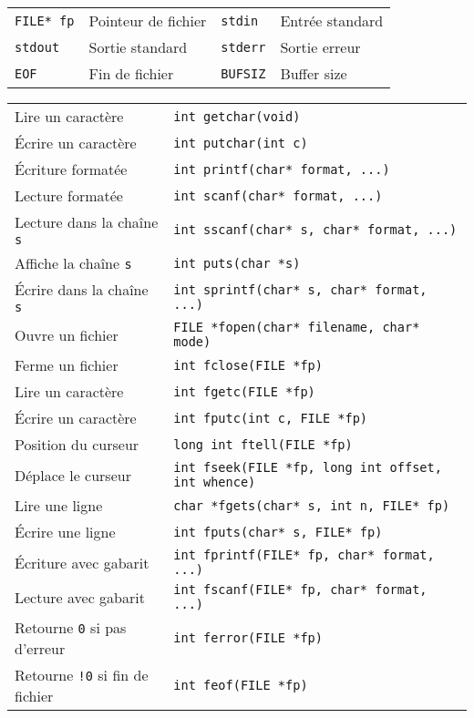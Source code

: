 \documentclass{article}
\newcommand{\cd}{\lstinline}
\begin{document}
\begin{multicols*}{3}
\begin{tabularx}{\linewidth}{
  >{\hsize=0.5\hsize}X%
  >{\hsize=1.5\hsize}X%
  >{\hsize=0.5\hsize}X%
  >{\hsize=1.5\hsize}X%
  }
  \cd{FILE* fp} & Pointeur de fichier & \cd{stdin} & Entrée standard \\
  \cd{stdout}   & Sortie standard     & \cd{stderr} & Sortie erreur \\
  \cd{EOF}      & Fin de fichier      & \cd{BUFSIZ} & Buffer size \\
\end{tabularx}

\begin{tabularx}{\linewidth}{Xl}
  Lire un caractère & \cd{int getchar(void)} \rule{0pt}{3ex} \\
  Écrire un caractère & \cd{int putchar(int c)} \\
  Écriture formatée & \cd{int printf(char* format, ...)} \\
  Lecture formatée & \cd{int scanf(char* format, ...)} \\
  Lecture dans la chaîne \texttt{s} & \cd{int sscanf(char* s, char* format, ...)} \\
  Affiche la chaîne \texttt{s} & \cd{int puts(char *s)} \\
  Écrire dans la chaîne \texttt{s} & \cd{int sprintf(char* s, char* format, ...)}  \\
  Ouvre un fichier & \cd{FILE *fopen(char* filename, char* mode)} \\
  Ferme un fichier & \cd{int fclose(FILE *fp)} \\
  Lire un caractère & \cd{int fgetc(FILE *fp)} \\
  Écrire un caractère & \cd{int fputc(int c, FILE *fp)} \\

  Position du curseur & \cd{long int ftell(FILE *fp)} \\
  Déplace le curseur & \cd{int fseek(FILE *fp, long int offset, int whence)} \\

  Lire une ligne & \cd{char *fgets(char* s, int n, FILE* fp)} \\
  Écrire une ligne & \cd{int fputs(char* s, FILE* fp)} \\

  Écriture avec gabarit & \cd{int fprintf(FILE* fp, char* format, ...)} \\
  Lecture avec gabarit & \cd{int fscanf(FILE* fp, char* format, ...)} \\

  Retourne \cd{0} si pas d'erreur & \cd{int ferror(FILE *fp)} \\
  Retourne \cd{!0} si fin de fichier & \cd{int feof(FILE *fp)} \\
\end{tabularx}


\end{multicols*}
\end{document}
